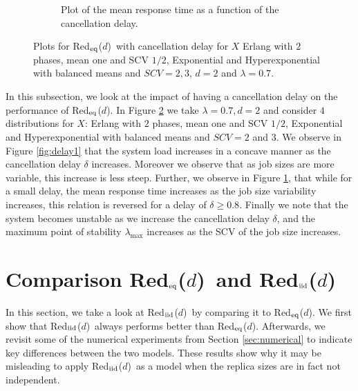 \documentclass[12pt]{report}
\newcommand{\Redid}{Red$_{\textup{eq}}$($d$)}
\newcommand{\Redind}{Red$_{\textup{iid}}$($d$)}
\begin{document}
\begin{figure}[t]
\begin{subfigure}{.45\textwidth}
\begin{center}
\caption{Plot of the mean response time as a function of the cancellation delay.}
\label{fig:delay2}
\end{center}
\end{subfigure}
\caption{Plots for \Redid\ with cancellation delay for $X$ Erlang with $2$ phases, mean one and SCV $1/2$, Exponential and Hyperexponential with balanced means and $SCV=2,3$, $d=2$ and $\lambda=0.7$.}
\label{fig:delay}
\end{figure}
In this subsection, we look at the impact of having a cancellation delay on the performance of \Redid . In Figure \ref{fig:delay} we take $\lambda = 0.7, d=2$ and consider $4$ distributions for $X$: Erlang with $2$ phases, mean one and SCV $1/2$, Exponential and Hyperexponential with balanced means and $SCV=2$ and $3$. We observe in Figure \ref{fig:delay1} that the system load increases in a concave manner as the cancellation delay $\delta$ increases. Moreover we observe that as job sizes are more variable, this increase is less steep. Further, we observe in Figure \ref{fig:delay2}, that while for a small delay, the mean response time increases as the job size variability increases, this relation is reversed for a delay of $\delta \geq 0.8$. Finally we note that the system becomes unstable as we increase the cancellation delay $\delta$, and the maximum point of stability $\lambda_{\max}$ increases as the SCV of the job size increases.

\section{Comparison \Redid\ and \Redind}\label{sec:compare}
In this section, we take a look at \Redind\ by comparing it to \Redid . We first show that \Redind\ always performs better than \Redid. 
Afterwards, we revisit some of the numerical experiments from Section \ref{sec:numerical} to indicate key differences between the two models. These results 
show why it may be misleading to apply \Redind\ as a model when the replica sizes are in fact not
independent.
\end{document}

